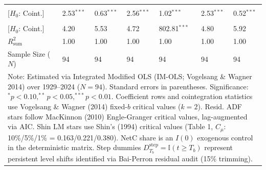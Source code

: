 \begin{table}[H]
\begin{tabular}{p{3.8cm}p{2.1cm}p{2.1cm}p{2.1cm}p{2.1cm}p{2.1cm}p{2.1cm}}
\makecell[l]{Shin LM ($C_{\text{Shin}}$) \\ {\scriptsize [$H_0$: Coint.]}} & 2.53$^{***}$ & 0.63$^{***}$ & 2.56$^{***}$ & 1.02$^{***}$ & 2.53$^{***}$ & 0.52$^{***}$  \\
\makecell[l]{VW Type 2 ($S_{\text{Type 2}}$) \\ {\scriptsize [$H_0$: Coint.]}} & 4.20 & 5.53 & 4.72 & 802.81$^{***}$ & 4.80 & 5.92  \\
\midrule
$R^2_{\text{sum}}$ & 1.00 & 1.00 & 1.00 & 1.00 & 1.00 & 1.00  \\
Sample Size ($N$) & 94 & 94 & 94 & 94 & 94 & 94  \\
\bottomrule
\multicolumn{7}{p{16.5cm}}{\footnotesize Note: Estimated via Integrated Modified OLS (IM-OLS; Vogelsang \& Wagner 2014) over 1929--2024 ($N=94$). Standard errors in parentheses. Significance: $^*p<0.10, ^{**}p<0.05, ^{***}p<0.01$. Coefficient rows and cointegration statistics use Vogelsang \& Wagner (2014) fixed-$b$ critical values ($k=2$). Resid. ADF stars follow MacKinnon (2010) Engle-Granger critical values, lag-augmented via AIC. Shin LM stars use Shin's (1994) critical values (Table 1, $C_\mu$: 10\%/5\%/1\% = 0.163/0.221/0.380). NetC share is an $I(0)$ exogenous control in the deterministic matrix. Step dummies $D^{\text{step}}_{T_b} = \mathbb{I}(t \ge T_b)$ represent persistent level shifts identified via Bai-Perron residual audit (15\% trimming).}
\end{tabular}
\end{table}

